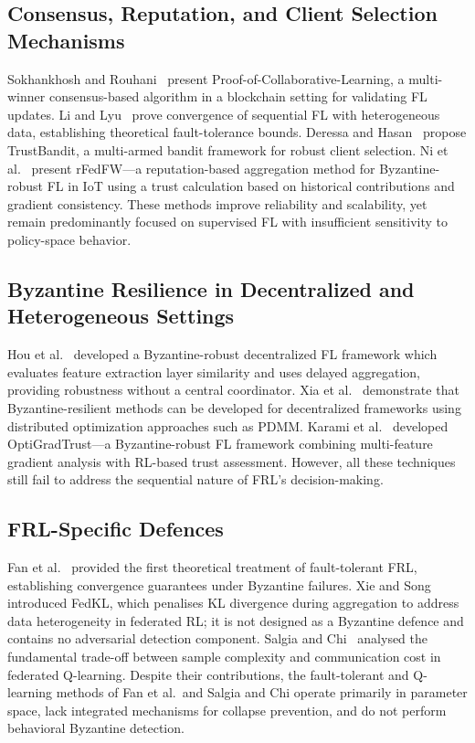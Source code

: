 \documentclass[12pt,a4paper]{article}
\begin{document}
\subsection{Consensus, Reputation, and Client Selection Mechanisms}

Sokhankhosh and Rouhani~\cite{ref6} present Proof-of-Collaborative-Learning, a
multi-winner consensus-based algorithm in a blockchain setting for validating FL
updates. Li and Lyu~\cite{ref7} prove convergence of sequential FL with heterogeneous
data, establishing theoretical fault-tolerance bounds. Deressa and Hasan~\cite{ref14}
propose TrustBandit, a multi-armed bandit framework for robust client selection. Ni
et al.~\cite{ref18} present rFedFW---a reputation-based aggregation method for
Byzantine-robust FL in IoT using a trust calculation based on historical contributions
and gradient consistency. These methods improve reliability and scalability, yet remain
predominantly focused on supervised FL with insufficient sensitivity to policy-space
behavior.

\subsection{Byzantine Resilience in Decentralized and Heterogeneous Settings}

Hou et al.~\cite{ref28} developed a Byzantine-robust decentralized FL framework which
evaluates feature extraction layer similarity and uses delayed aggregation, providing
robustness without a central coordinator. Xia et al.~\cite{ref29} demonstrate that
Byzantine-resilient methods can be developed for decentralized frameworks using
distributed optimization approaches such as PDMM. Karami et al.~\cite{ref1} developed
OptiGradTrust---a Byzantine-robust FL framework combining multi-feature gradient
analysis with RL-based trust assessment. However, all these techniques still fail to
address the sequential nature of FRL's decision-making.

\subsection{FRL-Specific Defences}

Fan et al.~\cite{ref15} provided the first theoretical treatment of fault-tolerant FRL,
establishing convergence guarantees under Byzantine failures. Xie and Song~\cite{ref17}
introduced FedKL, which penalises KL divergence during aggregation to address data
heterogeneity in federated RL; it is not designed as a Byzantine defence and contains no
adversarial detection component. Salgia and Chi~\cite{ref30} analysed the fundamental
trade-off between sample complexity and communication cost in federated Q-learning.
Despite their contributions, the fault-tolerant and Q-learning methods of Fan et al.\ and
Salgia and Chi operate primarily in parameter space, lack integrated mechanisms for
collapse prevention, and do not perform behavioral Byzantine detection.
\end{document}
